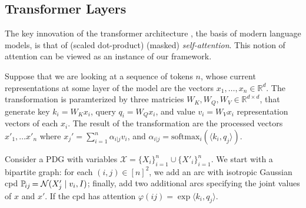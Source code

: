 \documentclass[twoside]{article}
\let\cite\citep
\theoremstyle{plain}
\theoremstyle{definition}
\theoremstyle{remark}
\begin{document}
\subsection{Transformer Layers}


The key innovation of the transformer architecture \cite{vaswani2017attention}, the basis of modern language models, 
is that of (scaled dot-product) (masked) \emph{self-attention}.
This notion of attention can be viewed as an instance of our framework.

Suppose that we are looking at a sequence of tokens $n$, whose current representations at some layer of the model are the vectors $x_1, \ldots, x_n \in \mathbb R^d$. 
The transformation is paramterized by three matricies $W_K, W_Q, W_V \in \mathbb R^{d \times d}$, 
that generate key $k_i = W_K x_i$, query $q_i = W_Q x_i$, and value $v_i = W_V x_i$ representation vectors of each $x_i$.
The result of the transformation are the processed vectors  $x'_1, \ldots x'_n$
where $x_j' = \sum_{i=1}^n \alpha_{i|j} v_i$, and $\alpha_{i|j} = \mathrm{softmax}_i( \langle k_i, q_j \rangle)$.


Consider a PDG with variables $\mathcal X = \{ X_i \}_{i=1}^n \cup \{ X'_i\}_{i=1}^n$. 
We start with a bipartite graph: for each $(i,j) \in [n]^2$, 
we add an arc 
with isotropic Gaussian cpd $\p_{ij} = \mathcal N(X'_j \mid v_i, I)$; finally, 
   add two additional arcs specifying the joint values of $x$ and $x'$.
If the cpd has attention $\varphi(ij) = \exp \langle k_i, q_j\rangle$.
\end{document}
